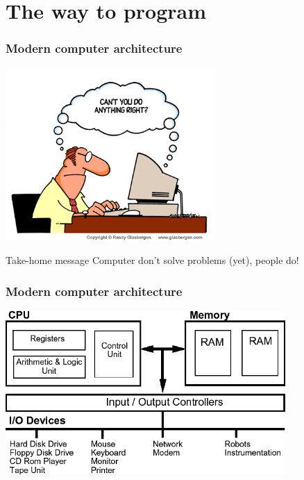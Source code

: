\documentclass[handout]{beamer}
\begin{document}
\section{The way to program}
\begin{frame}[fragile]
  \frametitle{Modern computer architecture}
  \begin{center}
  \includegraphics[width=0.6\textwidth]{computer_comic.png}
  \end{center}
  \begin{block}{Take-home message}
  Computer don't solve problems (yet), people do!
  \end{block}
\end{frame}

\begin{frame}[fragile]
  \frametitle{Modern computer architecture}
  \begin{center}
  \includegraphics[width=0.8\textwidth]{computer_architecture.png}
  \end{center}
\end{frame}
\end{document}
